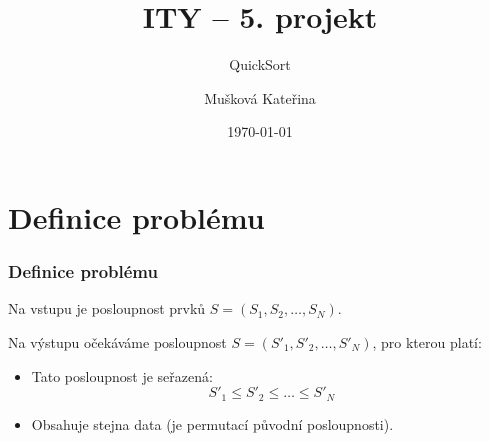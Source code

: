 \documentclass{beamer}
\title[]{ITY -- 5. projekt}
\subtitle[]{QuickSort}
\author{Mušková Kateřina}
\date{\today}
\begin{document}
\begin{frame}
  \titlepage
\end{frame}

\section{Definice problému}
\begin{frame}
  \frametitle{Definice problému}
  Na vstupu je posloupnost prvků $S = (S_1, S_2, \dots, S_N)$.
  
  Na výstupu očekáváme posloupnost $S = (S'_1, S'_2, \dots, S'_N)$, pro kterou platí:
  \begin{itemize}
  \item Tato posloupnost je seřazená: $$S'_1 \leq S'_2 \leq \dots \leq S'_N$$
  \item Obsahuje stejna data (je permutací původní posloupnosti). \cite{def}
  \end{itemize}
  
\end{frame}
\end{document}
